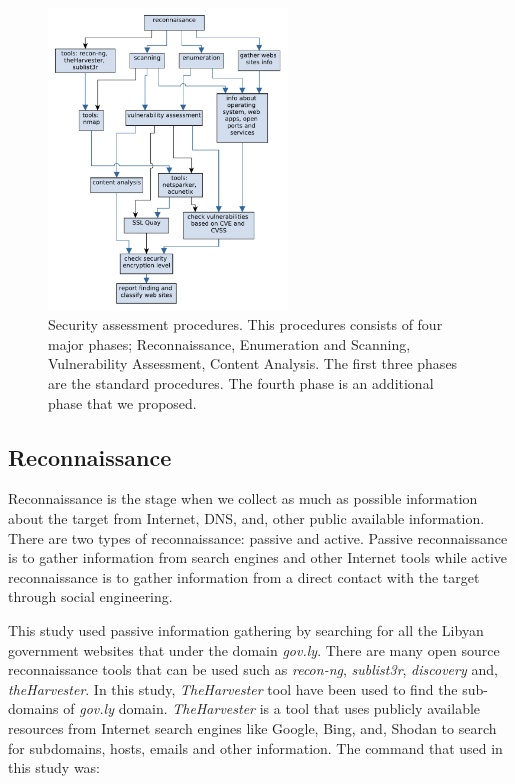 \documentclass[conference]{IEEEtran}
\begin{document}
\begin{figure}[htbp]
	\centerline{\includegraphics[width=2.5in]{steps.pdf}}
	\caption{Security assessment procedures. This procedures
          consists of four major phases; Reconnaissance, Enumeration
          and Scanning, Vulnerability Assessment, Content
          Analysis. The first three phases are the standard
          procedures. The fourth phase is an additional phase that we
          proposed.}
	\label{fig:steps}
\end{figure}

\subsection{Reconnaissance}

Reconnaissance is the stage when we collect as much as possible
information about the target from Internet, DNS, and, other public
available information.  There are two types of reconnaissance: passive
and active. Passive reconnaissance is to gather information from
search engines and other Internet tools while active reconnaissance is
to gather information from a direct contact with the target through
social engineering.

This study used passive information gathering by searching for all the
Libyan government websites that under the domain \emph{gov.ly}. There
are many open source reconnaissance tools that can be used such as
\emph{recon-ng}, \emph{sublist3r}, \emph{discovery} and,
\emph{theHarvester}\cite{buchanan2017kali}.  In this study,
\emph{TheHarvester} tool have been used to find the sub- domains of
\emph{gov.ly} domain. \emph{TheHarvester} is a tool that uses publicly
available resources from Internet search engines like Google, Bing,
and, Shodan to search for subdomains, hosts, emails and other
information. The command that used in this study was:
\end{document}
